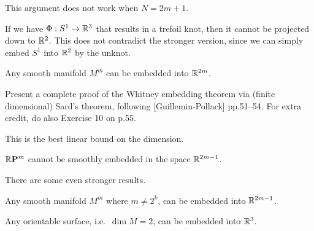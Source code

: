 This argument does not work when \(N = 2m+1\).
\begin{example}
  If we have \(\Phi:S^1\to\mathbb{R}^3\) that results in a trefoil knot, then it cannot be projected down to \(\mathbb{R}^2\). This does not contradict the stronger version, since we can simply embed \(S^1\) into \(\mathbb{R}^2\) by the unknot.
\end{example}

\begin{theorem}
  Any smooth manifold \(M^m\) can be embedded into \(\mathbb{R}^{2m}\).
\end{theorem}
\begin{project}
  Present a complete proof of the Whitney embedding theorem via (finite dimensional) Sard's theorem,
following [Guillemin-Pollack] pp.51--54. For extra credit, do also Exercise 10 on p.55.
\end{project}

This is the best linear bound on the dimension.
\begin{example}
  \(\mathbb{R}\mathbf{P}^m\) cannot be smoothly embedded in the space \(\mathbb{R}^{2m-1}\).
\end{example}

There are some even stronger results. 
\begin{proposition}
  Any smooth manifold \(M^m\) where \(m\neq 2^k\), can be embedded into \(\mathbb{R}^{2m-1}\).
\end{proposition}

\begin{proposition}
  Any orientable surface, i.e.\ \(\dim M = 2\), can be embedded into \(\mathbb{R}^3\).
\end{proposition}